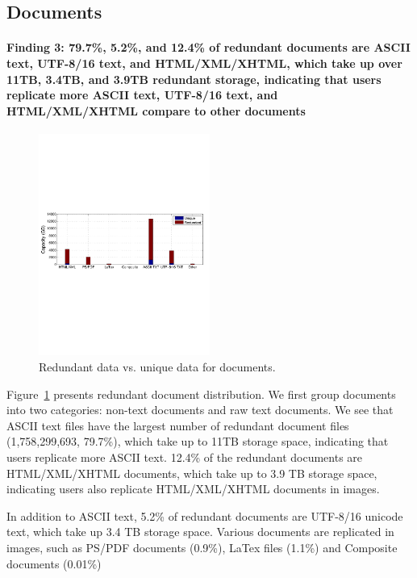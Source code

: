 \subsection{Documents}
\paragraph{Finding 3: 79.7\%, 5.2\%, and 12.4\% of redundant documents are ASCII text, UTF-8/16 text, and HTML/XML/XHTML, which take up over 11TB, 3.4TB, and 3.9TB redundant storage, indicating that users replicate more ASCII text, UTF-8/16 text, and HTML/XML/XHTML compare to other documents}

\begin{figure}
	\centering
	\includegraphics[width=0.5\textwidth]{graphs/type-utili-cap}
	\caption{Redundant data vs. unique data for documents.
	}
	\label{fig:type-doc}
\end{figure}

Figure~\ref{fig:type-doc} presents redundant document distribution. We first group documents into two categories: non-text documents and raw text documents. 
We see that ASCII text files have the largest number of redundant document files (1,758,299,693, 79.7\%), which take up to 11TB storage space, indicating that users replicate more ASCII text. 
12.4\% of the redundant documents are HTML/XML/XHTML documents, which take up to 3.9 TB storage space, indicating users also replicate HTML/XML/XHTML documents in images.  

In addition to ASCII text, 5.2\% of redundant documents are UTF-8/16 unicode text, which take up 3.4 TB storage space.
Various documents are replicated in images, such as PS/PDF documents (0.9\%), LaTex files (1.1\%) and Composite documents (0.01\%)

